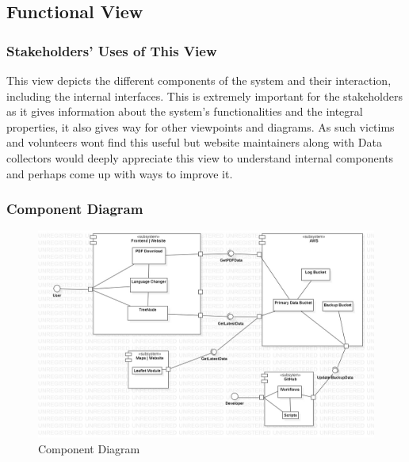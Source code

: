 \subsection{Functional View}

\subsubsection{Stakeholders' Uses of This View}

This view depicts the different components of the system and their interaction, including the internal interfaces. This is extremely important for the stakeholders as it gives information about the system's functionalities and the integral properties, it also gives way for other viewpoints and diagrams. As such victims and volunteers wont find this useful but website maintainers along with Data collectors would deeply appreciate this view to understand internal components and perhaps come up with ways to improve it.

\subsubsection{Component Diagram}

\begin{figure}[H]
  \centering
  \includegraphics[width=\linewidth]{img/component-diagram.jpg}
  \caption{Component Diagram}
\end{figure}

